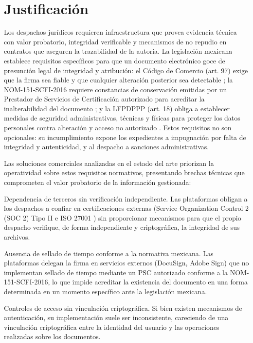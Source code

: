 \section{Justificación}\label{sec:justificacion}

Los despachos jurídicos requieren infraestructura que provea evidencia técnica con valor probatorio, integridad verificable y mecanismos de no repudio en contratos que aseguren la trazabilidad de la autoría. La legislación mexicana establece requisitos específicos para que un documento electrónico goce de presunción legal de integridad y atribución: el Código de Comercio (art. 97) exige que la firma sea fiable y que cualquier alteración posterior sea detectable \cite{ccom2018}; la NOM-151-SCFI-2016 requiere constancias de conservación emitidas por un Prestador de Servicios de Certificación autorizado para acreditar la inalterabilidad del documento \cite{nom151_2016}; y la LFPDPPP (art. 18) obliga a establecer medidas de seguridad administrativas, técnicas y físicas para proteger los datos personales contra alteración y acceso no autorizado \cite{lfpdppp2025}. Estos requisitos no son opcionales: su incumplimiento expone los expedientes a impugnación por falta de integridad y autenticidad, y al despacho a sanciones administrativas.

Las soluciones comerciales analizadas en el estado del arte priorizan la operatividad sobre estos requisitos normativos, presentando brechas técnicas que comprometen el valor probatorio de la información gestionada:

Dependencia de terceros sin verificación independiente. Las plataformas obligan a los despachos a confiar en certificaciones externas (Service Organization Control 2 (SOC 2) Tipo II e ISO 27001 \cite{iso27001}) sin proporcionar mecanismos para que el propio despacho verifique, de forma independiente y criptográfica, la integridad de sus archivos.

Ausencia de sellado de tiempo conforme a la normativa mexicana. Las plataformas delegan la firma en servicios externos (DocuSign, Adobe Sign) que no implementan sellado de tiempo mediante un PSC autorizado conforme a la NOM-151-SCFI-2016, lo que impide acreditar la existencia del documento en una forma determinada en un momento específico ante la legislación mexicana.

Controles de acceso sin vinculación criptográfica. Si bien existen mecanismos de autenticación, su implementación suele ser inconsistente, careciendo de una vinculación criptográfica entre la identidad del usuario y las operaciones realizadas sobre los documentos.


